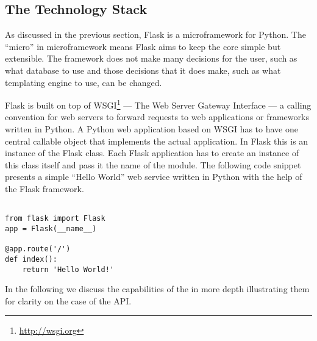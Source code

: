 


\subsection{The Technology Stack}
\label{sec:flask}

 As discussed in the previous section, Flask is a microframework for Python. 
 The ``micro'' in microframework means Flask aims to keep the core simple but extensible. 
 The framework does not make many decisions for the user, such as what database to use and
 those decisions that it does make, such as what templating engine to use, can be changed. 

 Flask is built on top of WSGI\footnote{\url{http://wsgi.org}} --- The Web Server Gateway Interface --- a calling convention for web servers to forward requests to web applications or frameworks written in Python. A Python web application based on WSGI has to have one central callable object that implements the actual application. In Flask this is an instance of the Flask class. Each Flask application has to create an instance of this class itself and pass it the name of the module. The following code snippet presents a simple ``Hello World'' web service written in Python with the help of the Flask framework. 

\begin{lstlisting}[style=custompython]

from flask import Flask
app = Flask(__name__)

@app.route('/')
def index():
    return 'Hello World!'

\end{lstlisting}

In the following we discuss the capabilities of the \tool in more depth illustrating them for clarity on the case of the \zee API.



